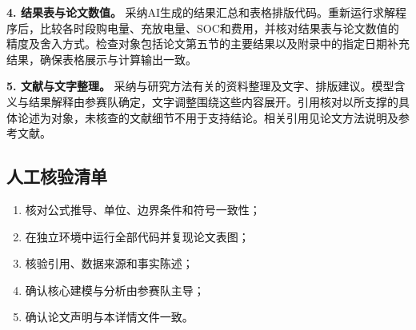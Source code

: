 \documentclass[withoutpreface,bwprint]{cumcmthesis}
\begin{document}
\noindent\textbf{4. 结果表与论文数值。}
采纳AI生成的结果汇总和表格排版代码。重新运行求解程序后，比较各时段购电量、充放电量、SOC和费用，并核对结果表与论文数值的精度及舍入方式。检查对象包括论文第五节的主要结果以及附录中的指定日期补充结果，确保表格展示与计算输出一致。

\noindent\textbf{5. 文献与文字整理。}
采纳与研究方法有关的资料整理及文字、排版建议。模型含义与结果解释由参赛队确定，文字调整围绕这些内容展开。引用核对以所支撑的具体论述为对象，未核查的文献细节不用于支持结论。相关引用见论文方法说明及参考文献。

\subsection*{人工核验清单}
\begin{enumerate}[label=\arabic*)]
\item 核对公式推导、单位、边界条件和符号一致性；
\item 在独立环境中运行全部代码并复现论文表图；
\item 核验引用、数据来源和事实陈述；
\item 确认核心建模与分析由参赛队主导；
\item 确认论文声明与本详情文件一致。
\end{enumerate}
\end{document}

